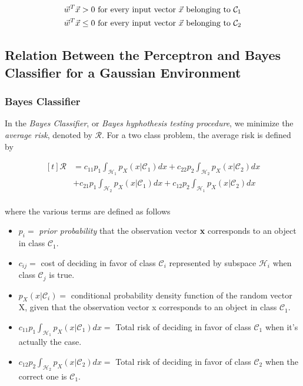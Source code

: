 \documentclass[twocolumn]{article}
\newcommand{\integral}{\displaystyle\int}
\begin{document}
	 $$ \begin{aligned}[t]
			  & \vec{w}^{T} \vec{x} > 0 \text{ for every input vector $ \vec{x} $ belonging to $ \mathcal{C}_{1} $}         \\
			  & \vec{w}^{T} \vec{x} \leq 0 \text{ for every input vector } \vec{x} \text{ belonging to $ \mathcal{C}_{2} $} \\
		 \end{aligned} $$


 \subsection{Relation Between the Perceptron and Bayes Classifier for a Gaussian Environment}

	 \subsubsection{Bayes Classifier}

		 In the \textit{Bayes Classifier}, or \textit{Bayes hyphothesis testing procedure}, we minimize the \textit{average risk}, denoted by \( \mathcal{R} \). For a two class problem, the average risk is defined by

		 $$ \begin{aligned}[t]
				 \mathcal{R} & = c_{11}p_{1}\integral_{ \mathcal{H}_{1}}p_{X} (x | \mathcal{C}_{1})dx + c_{22}p_{2}\integral_{ \mathcal{H}_{2}}p_{X} (x | \mathcal{C}_{2})dx  \\
				             & + c_{21}p_{1}\integral_{ \mathcal{H}_{2}}p_{X} (x | \mathcal{C}_{1})dx + c_{12}p_{2}\integral_{ \mathcal{H}_{1}} p_{X} (x | \mathcal{C}_{2})dx \\
			 \end{aligned} $$

		 \noindent where the various terms are defined as follows

		 \begin{itemize}
			 \item $ p_{i} =$ \textit{prior probability} that the observation vector \textbf{x} corresponds to an object in class $ \mathcal{C}_{1} $.
			 \item $ c_{ij} =$ cost of deciding in favor of class $ \mathcal{C}_{i} $ represented by subspace $ \mathcal{H}_{i} $ when class $ \mathcal{C}_{j} $ is true.
			 \item $ p_{X} (x | \mathcal{C}_{i}) =$ conditional probability density function of the random vector X, given that the observation vector x corresponds to an object in class $ \mathcal{C}_{1} $.
			 \item $ c_{11}p_{1}\integral_{ \mathcal{H}_{1}} p_{X} (x | \mathcal{C}_{1})dx =$ Total risk of deciding in favor of class $ \mathcal{C}_{1} $ when it's actually the case.
			 \item $ c_{12}p_{2}\integral_{ \mathcal{H}_{2}} p_{X} (x | \mathcal{C}_{2})dx =$ Total risk of deciding in favor of class $ \mathcal{C}_{2} $ when the correct one is $ \mathcal{C}_{1} $.
		 \end{itemize}
\end{document}

